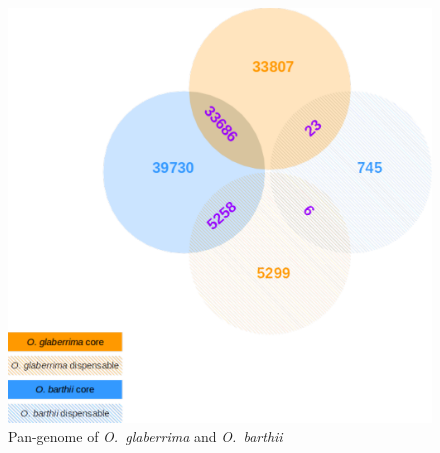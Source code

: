 \documentclass[10pt,letterpaper]{article}
\begin{document}
\begin{figure}
\centering
\includegraphics[scale=0.7]{panGenomeBothSpecies.pdf}
\caption{Pan-genome of \emph{O.~glaberrima} and \emph{O.~barthii}}
\label{panGSize}
\end{figure}
\end{document}
